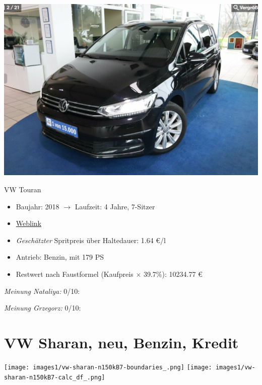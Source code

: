 \documentclass[landscape, DIV=99, 14pt]{scrartcl}
\begin{document}
\pagebreak
\begin{center}
\includegraphics[width=0.9\columnwidth]{cars/vw-touran-geb2.png}

VW Touran
\end{center}

\begin{itemize}
    \item Baujahr: 2018 $\rightarrow$ Laufzeit: 4 Jahre, 7-Sitzer
    \item \href{https://suchen.mobile.de/fahrzeuge/details.html?id=337573342}{Weblink}
    \item \emph{Gesch\"atzter} Spritpreis \"uber Haltedauer: 1.64 \euro{}/l
    \item Antrieb: Benzin, mit 179 PS
    \item Restwert nach Faustformel (Kaufpreis $\times$ 39.7\%): 10234.77 \euro{}
\end{itemize}

\begin{small}
\emph{Meinung Nataliya:} 0/10: 
        
\emph{Meinung Grzegorz:} 0/10: 
\end{small}

\pagebreak


\twocolumn

\section*{VW Sharan, neu, Benzin, Kredit}
\begin{center}
\texttt{[image: images1/vw-sharan-n150kB7-boundaries\_.png]}
\null
\vspace{0.5cm}
\texttt{[image: images1/vw-sharan-n150kB7-calc\_df\_.png]}
\end{center}
\end{document}
